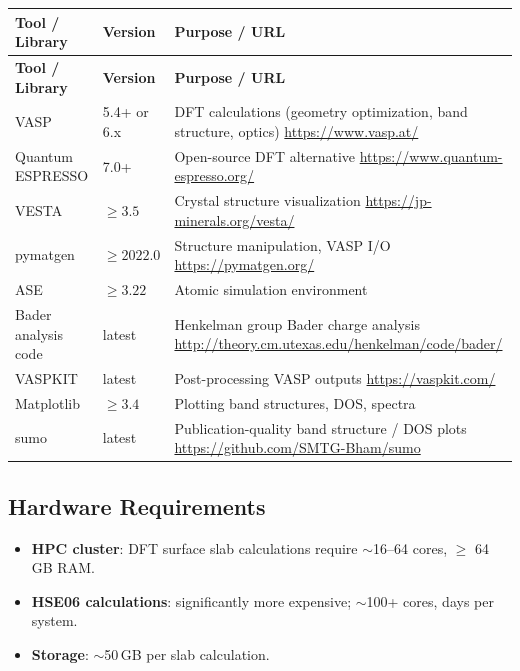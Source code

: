 \documentclass[11pt,a4paper]{article}
\begin{document}
\begin{longtable}{p{4.5cm} p{2.5cm} p{6.5cm}}
\toprule
\textbf{Tool / Library} & \textbf{Version} & \textbf{Purpose / URL} \\
\midrule
\endfirsthead
\toprule
\textbf{Tool / Library} & \textbf{Version} & \textbf{Purpose / URL} \\
\midrule
\endhead
VASP & 5.4+ or 6.x & DFT calculations (geometry optimization, band structure, optics) \newline \url{https://www.vasp.at/} \\
\midrule
Quantum ESPRESSO & 7.0+ & Open-source DFT alternative \newline \url{https://www.quantum-espresso.org/} \\
\midrule
VESTA & $\geq 3.5$ & Crystal structure visualization \newline \url{https://jp-minerals.org/vesta/} \\
\midrule
pymatgen & $\geq 2022.0$ & Structure manipulation, VASP I/O \newline \url{https://pymatgen.org/} \\
\midrule
ASE & $\geq 3.22$ & Atomic simulation environment \\
\midrule
Bader analysis code & latest & Henkelman group Bader charge analysis \newline \url{http://theory.cm.utexas.edu/henkelman/code/bader/} \\
\midrule
VASPKIT & latest & Post-processing VASP outputs \newline \url{https://vaspkit.com/} \\
\midrule
Matplotlib & $\geq 3.4$ & Plotting band structures, DOS, spectra \\
\midrule
sumo & latest & Publication-quality band structure / DOS plots \newline \url{https://github.com/SMTG-Bham/sumo} \\
\bottomrule
\end{longtable}

\subsection{Hardware Requirements}
\begin{itemize}
  \item \textbf{HPC cluster}: DFT surface slab calculations require $\sim$16--64 cores, $\geq$ 64\,GB RAM.
  \item \textbf{HSE06 calculations}: significantly more expensive; $\sim$100+ cores, days per system.
  \item \textbf{Storage}: $\sim$50\,GB per slab calculation.
\end{itemize}
\end{document}
